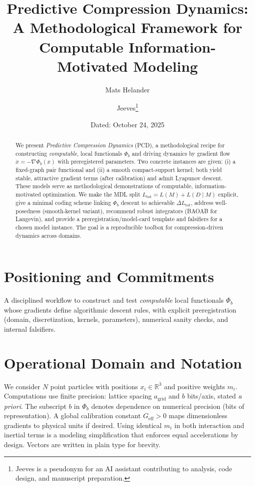 \documentclass[11pt,a4paper]{article}
\title{\bf Predictive Compression Dynamics:\\
A Methodological Framework for Computable Information-Motivated Modeling}
\author[1]{Mats Helander}
\author[1]{Jeeves\thanks{Jeeves is a pseudonym for an AI assistant contributing to analysis, code design, and manuscript preparation.}}
\affil[1]{Independent Research}
\date{Dated: October 24, 2025}
\numberwithin{equation}{section}
\newcommand{\R}{\mathbb{R}}
\begin{document}
\maketitle

\begin{abstract}
\noindent
We present \emph{Predictive Compression Dynamics} (PCD), a methodological recipe for constructing \emph{computable}, local functionals $\Phi_b$ and driving dynamics by gradient flow $\dot x=-\nabla\Phi_b(x)$ with preregistered parameters. Two concrete instances are given: (i) a fixed-graph pair functional and (ii) a smooth compact-support kernel; both yield stable, attractive gradient terms (after calibration) and admit Lyapunov descent. These models serve as methodological demonstrations of computable, information-motivated optimization. We make the MDL split $L_{\text{tot}}=L(M)+L(D\mid M)$ explicit, give a minimal coding scheme linking $\Phi_b$ descent to achievable $\Delta L_{\text{tot}}$, address well-posedness (smooth-kernel variant), recommend robust integrators (BAOAB for Langevin), and provide a preregistration/model-card template and falsifiers for a chosen model instance. The goal is a reproducible toolbox for compression-driven dynamics across domains.
\end{abstract}

\section{Positioning and Commitments}
A disciplined workflow to construct and test \emph{computable} local functionals $\Phi_b$ whose gradients define algorithmic descent rules, with explicit preregistration (domain, discretization, kernels, parameters), numerical sanity checks, and internal falsifiers.

\section{Operational Domain and Notation}
We consider $N$ point particles with positions $x_i\in\R^3$ and positive weights $m_i$. Computations use finite precision: lattice spacing $a_{\text{grid}}$ and $b$ bits/axis, stated \emph{a priori}. The subscript $b$ in $\Phi_b$ denotes dependence on numerical precision (bits of representation). A global calibration constant $G_{\text{eff}}>0$ maps dimensionless gradients to physical units if desired. Using identical $m_i$ in both interaction and inertial terms is a modeling simplification that enforces equal accelerations by design. Vectors are written in plain type for brevity.
\end{document}

